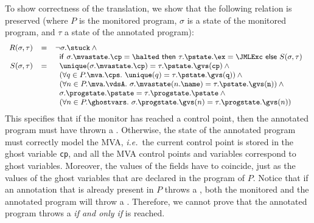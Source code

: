 To show correctness of the translation, we show that the following
relation is preserved (where \(P\) is the monitored program,
\(\sigma\) is a state of the monitored program, and \(\tau\) a state
of the annotated program):
\[{\small
\begin{array}{rcl}
R(\sigma, \tau) & = & \neg \sigma.\stuck \:\wedge\\
& & \begin{array}[t]{l}
\mathsf{if\ }\sigma.\mvastate.\cp = \halted
\mathsf{\ then\ }\tau.\pstate.\ex = \JMLExc
\mathsf{\ else\ }S(\sigma, \tau)
\end{array}\\
S(\sigma, \tau) & = &
\begin{array}[t]{l}
\unique(\sigma.\mvastate.\cp) = \tau.\pstate.\gvs(\texttt{cp}) \:\wedge\\
(\forall q \in P.\mva.\cps.\ \unique(q) =
\tau.\pstate.\gvs(\texttt{q})) \:\wedge\\
(\forall n \in P.\mva.\vdsA.\ \sigma.\mvastate(n.\name) =
                             \tau.\pstate.\gvs(\texttt{n})) \:\wedge\\
\sigma.\progstate.\pstate = \tau.\progstate.\pstate \:\wedge\\
(\forall n \in P.\ghostvars.\ \sigma.\progstate.\gvs(n) =
\tau.\progstate.\gvs(n))
\end{array}
\end{array}}
\]
This specifies that if the monitor has reached a \halted
control point, then the annotated program must have thrown a
\JMLExc. Otherwise, the state of the annotated program must correctly
model the MVA, \emph{i.e.}\ the current control point is stored in the
ghost variable \texttt{cp}, and all the MVA control points and
variables correspond to ghost variables. Moreover, the values of the
fields have to coincide, just as the values of the ghost variables
that are declared in the program of \(P\). Notice that if an
annotation that is already present in \(P\) throws a \JMLExc,
both the monitored and the annotated program will throw a \JMLExc.
Therefore, we cannot prove that the annotated program throws
a \JMLExc \emph{if and only if} \halted is reached.

